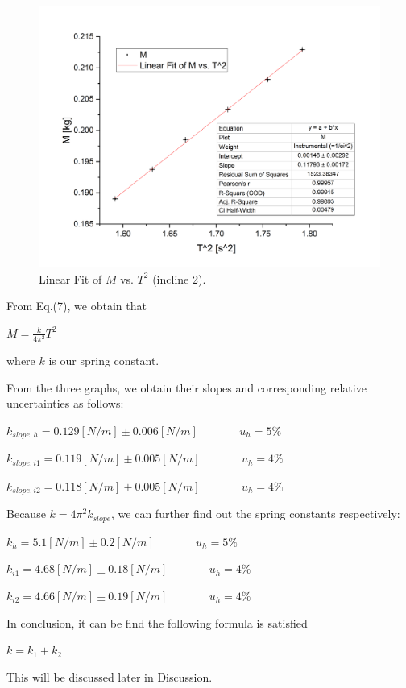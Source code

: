 \documentclass[a4paper,12pt]{article}
\begin{document}
\begin{figure}[p] 
    \centering
    \includegraphics[width=1\textwidth]{pic6} 
    \caption{Linear Fit of $M$ vs. $T^2$ (incline 2).} 
\end{figure}

\par From Eq.(7), we obtain that
\begin{center}
$\displaystyle M = \frac{k}{4\pi^2} T^2$
\end{center}
where $k$ is our spring constant.
\par From the three graphs, we obtain their slopes and corresponding relative uncertainties as follows:
\begin{center}
$ k_{slope, h} = 0.129 [N/m] \pm 0.006 [N/m]$ ~~~~~~ $ u_h = 5\% $
\end{center}
\begin{center}
$ k_{slope, i1} = 0.119 [N/m] \pm 0.005 [N/m]$ ~~~~~~ $ u_h = 4\% $
\end{center}
\begin{center}
$ k_{slope, i2} = 0.118 [N/m] \pm 0.005 [N/m]$ ~~~~~~ $ u_h = 4\% $
\end{center}
\par Because $ k = 4\pi^2 k_{slope} $, we can further find out the spring constants respectively:
\begin{center}
$ k_{h} = 5.1 [N/m] \pm 0.2 [N/m]$ ~~~~~~ $ u_h = 5\% $
\end{center}
\begin{center}
$ k_{i1} = 4.68 [N/m] \pm 0.18 [N/m]$ ~~~~~~ $ u_h = 4\% $
\end{center}
\begin{center}
$ k_{i2} = 4.66 [N/m] \pm 0.19 [N/m]$ ~~~~~~ $ u_h = 4\% $
\end{center}
\par In conclusion, it can be find the following formula is satisfied 
\begin{center}
$ k = k_1 + k_2 $
\end{center}
This will be discussed later in Discussion.
\end{document}
